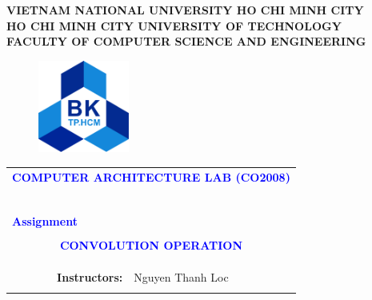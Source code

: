 \documentclass[a4paper]{article}
\begin{document}
\begin{titlepage}
\begin{center}
\textbf{\Large VIETNAM NATIONAL UNIVERSITY HO CHI MINH CITY} \\

\vspace{7pt}
\textbf{\Large HO CHI MINH CITY UNIVERSITY OF TECHNOLOGY} \\

\vspace{7pt}
\textbf{\Large FACULTY OF COMPUTER SCIENCE AND ENGINEERING}
\end{center}

\vspace{1cm}

\begin{figure}[h!]
\begin{center}
\includegraphics[width=3cm]{Images/hcmut.png}
\end{center}
\end{figure}

\vspace{1cm}


\begin{center}
\begin{tabular}{ccc}
	\multicolumn{3}{l}{\textbf{{\Large \textcolor{blue}{COMPUTER ARCHITECTURE LAB (CO2008)}}}}\\
	~~\\
	\arrayrulecolor{blue}\hline
	\\
	\multicolumn{3}{l}{\textbf{{\Large \textcolor{blue}{Assignment} }}}\\
	\\
	
	\multicolumn{3}{c}{\textbf{{\huge \textcolor{blue}{CONVOLUTION OPERATION}}}}\\
	\\

	\arrayrulecolor{blue}\hline \\ \\

    \multicolumn{1}{r}{\textbf{\Large Instructors:}} & \multicolumn{2}{l}{\Large Nguyen Thanh Loc} \\ \\


\end{tabular}
\end{center}
\end{titlepage}
\end{document}
